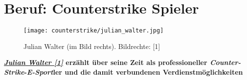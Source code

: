 \section*{Beruf: Counterstrike Spieler}
\hypertarget{counterstrike}{}
\label{counterstrike}
\begin{figure}
\texttt{[image: counterstrike/julian\_walter.jpg]} \\
\caption{Julian Walter (im Bild rechts). Bildrechte: [1]}
\end{figure}

\textbf{\href{https://plus.google.com/108488461844417773815/about}{\textit{Julian Walter [1]}} erzählt über seine Zeit als professioneller \textit{Counter-Strike}-\textit{E-Sport}ler und die damit verbundenen Verdienstmöglichkeiten} 



